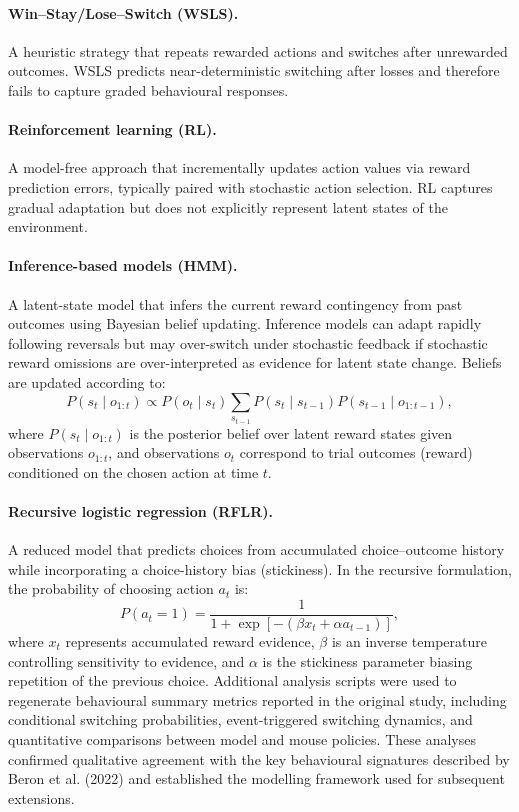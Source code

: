 \documentclass[11pt, reprint, aps, prl]{revtex4-2}
\begin{document}
\paragraph{\textbf{Win--Stay/Lose--Switch (WSLS).}}
A heuristic strategy that repeats rewarded actions and switches after unrewarded outcomes. WSLS predicts near-deterministic switching after losses and therefore fails to capture graded behavioural responses.
\paragraph{\textbf{Reinforcement learning (RL).}}
A model-free approach that incrementally updates action values via reward prediction errors, typically paired with stochastic action selection. RL captures gradual adaptation but does not explicitly represent latent states of the environment.
\paragraph{\textbf{Inference-based models (HMM).}}
A latent-state model that infers the current reward contingency from past outcomes using Bayesian belief updating. Inference models can adapt rapidly following reversals but may over-switch under stochastic feedback if stochastic reward omissions are over-interpreted as evidence for latent state change. Beliefs are updated according to:
\[
P(s_t \mid o_{1:t}) \propto P(o_t \mid s_t)\sum_{s_{t-1}} P(s_t \mid s_{t-1})P(s_{t-1} \mid o_{1:t-1}),
\]
where $P(s_t \mid o_{1:t})$ is the posterior belief over latent reward states given observations $o_{1:t}$, and observations $o_t$ correspond to trial outcomes (reward) conditioned on the chosen action at time $t$.
\paragraph{\textbf{Recursive logistic regression (RFLR).}}
A reduced model that predicts choices from accumulated choice--outcome history while incorporating a choice-history bias (stickiness). In the recursive formulation, the probability of choosing action $a_t$ is:
\[
P(a_t = 1)=\frac{1}{1+\exp\left[-(\beta x_t + \alpha a_{t-1})\right]},
\]
where $x_t$ represents accumulated reward evidence, $\beta$ is an inverse temperature controlling sensitivity to evidence, and $\alpha$ is the stickiness parameter biasing repetition of the previous choice.
Additional analysis scripts were used to regenerate behavioural summary metrics reported in the original study, including conditional switching probabilities, event-triggered switching dynamics, and quantitative comparisons between model and mouse policies. These analyses confirmed qualitative agreement with the key behavioural signatures described by Beron et al. (2022) and established the modelling framework used for subsequent extensions. 
\end{document}
